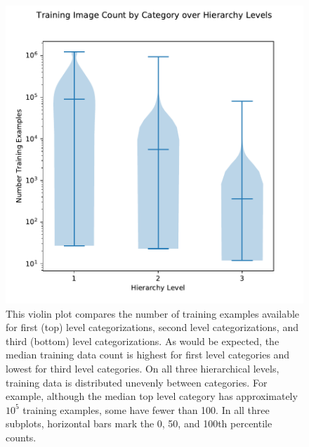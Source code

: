 \begin{figure}
\includegraphics[width=\columnwidth]{img/datacount}
\caption{
This violin plot compares the number of training examples available for first (top) level categorizations, second level categorizations, and third (bottom) level categorizations.
As would be expected, the median training data count is highest for first level categories and lowest for third level categories.
On all three hierarchical levels, training data is distributed unevenly between categories.
For example, although the median top level category has approximately $10^5$ training examples, some have fewer than 100.
In all three subplots, horizontal bars mark the 0, 50, and 100th percentile counts.
}
\label{fig:datacount}
\end{figure}